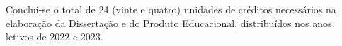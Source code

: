 \documentclass[
  12pt,       %
  openright,      %
  twoside,      %
  a4paper,      %
  english,      %
  french,       %
  spanish,      %
  brazil        %
  ]{abntex2}
\begin{document}
Conclui-se o total de 24 (vinte e quatro) unidades de créditos necessários na elaboração da Dissertação e do Produto Educacional, distribuídos nos anos letivos de 2022 e 2023.









\postextual



%
%









\end{document}
